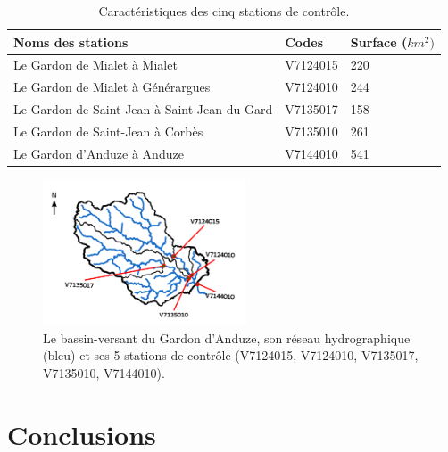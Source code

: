 \documentclass[a4paper,11pt]{article}
\begin{document}
\begin{minipage}{0.5\textwidth}
  \begin{table}[H]
      \caption{Caractéristiques des cinq stations de contrôle.}
      \label{tab:caracstations}
        \begin{center}
          \begin{tabular}{|p{4cm}|p{1.5cm}|p{1cm}|}
          \hline
           Noms des stations  & Codes & Surface ($km^2)$ \\ \hline
           Le Gardon de Mialet à Mialet	& V7124015 & 220\\\hline
           Le Gardon de Mialet à Générargues	& V7124010 & 244\\\hline
           Le Gardon de Saint-Jean à Saint-Jean-du-Gard	& V7135017 & 158\\\hline
           Le Gardon de Saint-Jean à Corbès	& V7135010 & 261\\\hline
           Le Gardon d'Anduze à Anduze	& V7144010 & 541\\\hline
          \end{tabular}
        \end{center}
      \end{table}
\end{minipage}
\hfill
\begin{minipage}{0.45\textwidth}
   
  \begin{figure}[H]
    \begin{center}
      \includegraphics[width=6cm]{Carte_gardon.pdf}
      \caption{Le bassin-versant du Gardon d'Anduze, son réseau hydrographique (bleu) et ses 5 stations de contrôle (V7124015, V7124010, V7135017, V7135010, V7144010).}
      \label{fig:BV}
    \end{center}
  \end{figure}

\end{minipage}
 
  

\section{Conclusions}
\end{document}
